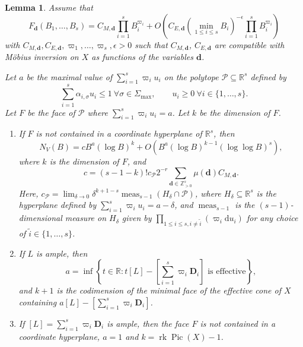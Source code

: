 \documentclass[10pt, a4paper, reqno, english]{amsart}
\newcommand\ZZ{\mathbb{Z}}
\newcommand\RR{\mathbb{R}}
\newcommand{\divclass}{{\mathbf D}} %
\DeclareMathOperator{\pic}{Pic} %
\DeclareMathOperator{\rk}{rk} %
\DeclareMathOperator{\meas}{meas} %
\newtheorem{lemma}[theorem]{Lemma}
\theoremstyle{definition}
\numberwithin{theorem}{section}
\numberwithin{equation}{section}
\begin{document}
\begin{lemma}\label{lem:counting}
Assume that 
\begin{equation}
F_{\mathbf d}(B_1,\dots,B_s)=C_{M,\mathbf d}\prod_{i=1}^sB_i^{\varpi_i} + O\left(C_{E,\mathbf d} \left(\min_{1\leq i\leq s}B_i\right)^{-\epsilon}\prod_{i=1}^sB_i^{\varpi_i}\right)
\end{equation}
with $C_{M,\mathbf d}, C_{E,\mathbf d}, \varpi_1,\dots,\varpi_s,\epsilon>0$ such that $C_{M,\mathbf d}$, $C_{E,\mathbf d}$ are compatible with M\"obius inversion on $X$ as functions of the variables $\mathbf d$.

Let $a$ be the maximal value of $\sum_{i=1}^s\varpi_iu_i$ on the polytope $\mathcal P\subseteq\RR^s$ defined by
$$
\sum_{i=1}^s\alpha_{i,\sigma}u_i\leq 1 \ \forall \sigma\in\Sigma_{\max}, \qquad u_i\geq 0 \ \forall i\in\{1,\dots,s\}.
$$
Let $F$ be the face of $\mathcal P$ where $\sum_{i=1}^s\varpi_iu_i=a$. Let $k$ be the dimension of $F$. 

\begin{enumerate}[label=(\roman*), ref=(\roman*)]
\item 
If $F$  is not contained in a coordinate hyperplane of $\RR^s$,
then 
$$N_V(B)=cB^a(\log B)^k +O(B^a(\log B)^{k-1}(\log\log B)^s),$$
where 
$k$ is the dimension of $F$, and
\begin{equation}
\label{eq:leading constant}
c=(s-1-k)! c_{\mathcal P}2^{-r}\sum_{\mathbf d\in\ZZ_{>0}^s}\mu(\mathbf d)C_{M,\mathbf d}. 
\end{equation}
Here, $c_{\mathcal P}=\lim_{\delta\to 0}\delta^{k+1-s}\meas_{s-1}(H_\delta\cap\mathcal P)$, where $H_\delta\subseteq\RR^s$ is the hyperplane defined by $\sum_{i=1}^s\varpi_iu_i=a-\delta$, and $\meas_{s-1}$ is the $(s-1)$-dimensional measure on $H_\delta$ given by $\prod_{1\leq i\leq s, i\neq\tilde i}(\varpi_i\mathrm du_i)$ for any choice of $\tilde i\in\{1,\dots,s\}$.

\item If $L$ is ample, then
$$
a=\inf\left\{t\in\RR: t[L]-\left [\sum_{i=1}^s\varpi_i\divclass_i\right ] \text{ is effective}\right\},
$$
and $k+1$ is the codimension of the minimal face of the effective cone of $X$ containing $a[L]-[\sum_{i=1}^s\varpi_i\divclass_i]$.

\item If $[L]=\sum_{i=1}^s\varpi_i\divclass_i$ is ample, then the face $F$ is not contained in a coordinate hyperplane, $a=1$ and $k=\rk\pic(X)-1$.

\end{enumerate}
\end{lemma}
\end{document}
